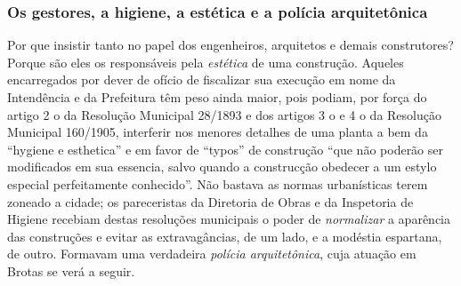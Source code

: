 \subsubsection{Os gestores, a higiene, a estética e a polícia arquitetônica}

Por que insistir tanto no papel dos engenheiros, arquitetos e demais construtores? Porque são eles os responsáveis pela \textit{estética} de uma construção. Aqueles encarregados por dever de ofício de fiscalizar sua execução em nome da Intendência e da Prefeitura têm peso ainda maior, pois podiam, por força do artigo 2 o da Resolução Municipal 28/1893 e dos artigos 3 o e 4 o da Resolução Municipal 160/1905, interferir nos menores detalhes de uma planta a bem da ``hygiene e esthetica'' e em favor de ``typos'' de construção ``que não poderão ser modificados em sua essencia, salvo quando a construcção obedecer a um estylo especial perfeitamente conhecido''. Não bastava as normas urbanísticas terem zoneado a cidade; os pareceristas da Diretoria de Obras e da Inspetoria de Higiene recebiam destas resoluções municipais o poder de \textit{normalizar} a aparência das construções e evitar as extravagâncias, de um lado, e a modéstia espartana, de outro. Formavam uma verdadeira \textit{polícia arquitetônica}, cuja atuação em Brotas se verá a seguir. 

